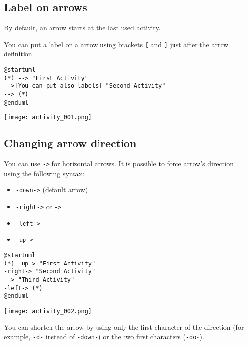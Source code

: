 \subsection{Label on arrows}

\begin{description}
\item By default, an arrow starts at the last used activity.
\item You can put a label on a arrow using brackets \texttt{[} and \texttt{]}
just after the arrow definition.
\end{description}


\begin{lstlisting}
@startuml
(*) --> "First Activity"
-->[You can put also labels] "Second Activity"
--> (*)
@enduml
\end{lstlisting}
\begin{center}
\texttt{[image: activity\_001.png]}
\end{center}

\newpage  \subsection{Changing arrow direction}

You can use \texttt{->} for horizontal arrows. It is possible to force arrow's
direction using the following syntax:

\begin{itemize}
\item \texttt{-down->} (default arrow)
\item \texttt{-right->} or \texttt{->}
\item \texttt{-left->}
\item \texttt{-up->}
\end{itemize}

\begin{lstlisting}
@startuml
(*) -up-> "First Activity"
-right-> "Second Activity"
--> "Third Activity"
-left-> (*)
@enduml
\end{lstlisting}
\begin{center}
\texttt{[image: activity\_002.png]}
\end{center}

You can shorten the arrow by using only the first character of the direction
(for example, \texttt{-d-} instead of \texttt{-down-}) or the two first
characters (\texttt{-do-}).

